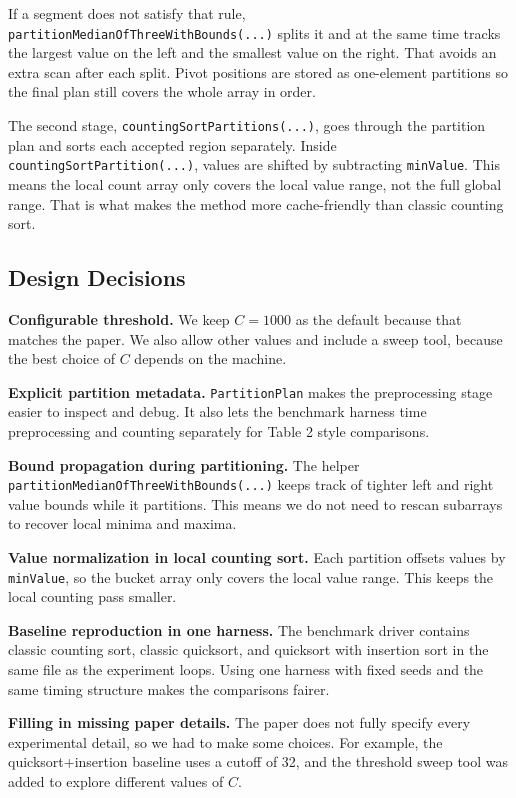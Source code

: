 \documentclass[11pt]{article}
\begin{document}
    If a segment does not satisfy that rule, \texttt{partitionMedianOfThreeWithBounds(...)} splits
    it and at the same time tracks the largest value on the left and the smallest value on the
    right. That avoids an extra scan after each split. Pivot positions are stored as one-element
    partitions so the final plan still covers the whole array in order.

    The second stage, \texttt{countingSortPartitions(...)}, goes through the partition plan and
    sorts each accepted region separately. Inside \texttt{countingSortPartition(...)}, values are
    shifted by subtracting \texttt{minValue}. This means the local count array only covers the
    local value range, not the full global range. That is what makes the method more
    cache-friendly than classic counting sort.

    \subsection{Design Decisions}

    \textbf{Configurable threshold.} We keep $C=1000$ as the default because that matches the
    paper. We also allow other values and include a sweep tool, because the best choice of $C$
    depends on the machine.

    \textbf{Explicit partition metadata.} \texttt{PartitionPlan} makes the preprocessing stage
    easier to inspect and debug. It also lets the benchmark harness time preprocessing and
    counting separately for Table 2 style comparisons.

    \textbf{Bound propagation during partitioning.} The helper
    \texttt{partitionMedianOfThreeWithBounds(...)} keeps track of tighter left and right value
    bounds while it partitions. This means we do not need to rescan subarrays to recover local
    minima and maxima.

    \textbf{Value normalization in local counting sort.} Each partition offsets values by
    \texttt{minValue}, so the bucket array only covers the local value range. This keeps the local
    counting pass smaller.

    \textbf{Baseline reproduction in one harness.} The benchmark driver contains classic counting
    sort, classic quicksort, and quicksort with insertion sort in the same file as the experiment
    loops. Using one harness with fixed seeds and the same timing structure makes the comparisons
    fairer.

    \textbf{Filling in missing paper details.} The paper does not fully specify every experimental
    detail, so we had to make some choices. For example, the quicksort+insertion baseline uses a
    cutoff of 32, and the threshold sweep tool was added to explore different values of $C$.
\end{document}
